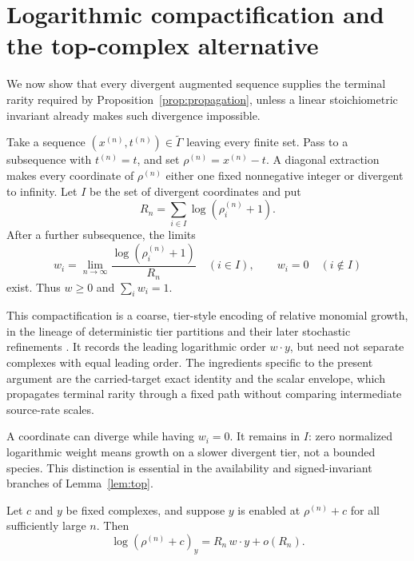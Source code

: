 \section{Logarithmic compactification and the top-complex alternative}
\label{sec:compact}

We now show that every divergent augmented sequence supplies the terminal
rarity required by Proposition~\ref{prop:propagation}, unless a linear
stoichiometric invariant already makes such divergence impossible.

Take a sequence \((x^{(n)},t^{(n)})\in\widetilde\Gamma\) leaving every finite
set.  Pass to a subsequence with \(t^{(n)}=t\), and set
\(\rho^{(n)}=x^{(n)}-t\).  A diagonal extraction makes every coordinate of
\(\rho^{(n)}\) either one fixed nonnegative integer or divergent to infinity.
Let \(I\) be the set of divergent coordinates and put
\begin{equation}\label{eq:Rn}
  R_n=\sum_{i\in I}\log(\rho_i^{(n)}+1).
\end{equation}
After a further subsequence, the limits
\begin{equation}\label{eq:weights}
  w_i=\lim_{n\to\infty}
  \frac{\log(\rho_i^{(n)}+1)}{R_n}
  \quad(i\in I),
  \qquad w_i=0\quad(i\notin I)
\end{equation}
exist.  Thus \(w\ge0\) and \(\sum_iw_i=1\).

This compactification is a coarse, tier-style encoding of relative monomial
growth, in the lineage of deterministic tier partitions and their later
stochastic refinements
\citep{Anderson2011GlobalAttractor,Anderson2011Boundedness,
AndersonKim2018,AndersonCappellettiKim2020,
AndersonCappellettiKimNguyen2020}.
It records the leading logarithmic order \(w\cdot y\), but need not separate
complexes with equal leading order.  The ingredients specific to the present
argument are the carried-target exact identity and the scalar envelope, which
propagates terminal rarity through a fixed path without comparing intermediate
source-rate scales.

\begin{remark}\label{rem:zero-weight}
A coordinate can diverge while having \(w_i=0\).  It remains in \(I\): zero
normalized logarithmic weight means growth on a slower divergent tier, not a
bounded species.  This distinction is essential in the availability and
signed-invariant branches of Lemma~\ref{lem:top}.
\end{remark}

\begin{lemma}\label{lem:ff-asymptotic}
Let \(c\) and \(y\) be fixed complexes, and suppose \(y\) is enabled at
\(\rho^{(n)}+c\) for all sufficiently large \(n\).  Then
\begin{equation}\label{eq:ff-asymptotic}
  \log(\rho^{(n)}+c)_y=R_n\,w\cdot y+o(R_n).
\end{equation}
\end{lemma}

